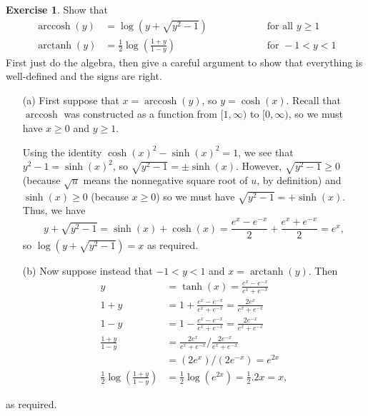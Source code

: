 \documentclass[a4paper]{book}
\newcommand{\arccosh}  {\operatorname{arccosh}}
\newcommand{\arctanh}  {\operatorname{arctanh}}
\renewcommand{\:}{\colon}
\theoremstyle{definition}
\newtheorem{exercise}[theorem]{Exercise}
\renewenvironment{solution}{\SolutionInline}{\endSolutionInline}
\begin{document}
\begin{exercise}
 Show that
 \[ \begin{array}{rlll}
  \arccosh(y) &= \log(y+\sqrt{y^2-1})
              & \hspace{4em} & \text{ for all } y\geq 1 \\
  \arctanh(y) &= \frac{1}{2}\log\left(\frac{1+y}{1-y}\right)
              & \hspace{4em} & \text{ for } -1<y<1
 \end{array} \]
 First just do the algebra, then give a careful argument to show that
 everything is well-defined and the signs are right.
\end{exercise}
\begin{solution}
 \begin{itemize}
 \item[(a)] First suppose that $x=\arccosh(y)$, so $y=\cosh(x)$.
  Recall that $\arccosh$ was constructed as a function from
  $[1,\infty)$ to $[0,\infty)$, so we must have $x\geq 0$ and
  $y\geq 1$.

  Using the identity $\cosh(x)^2-\sinh(x)^2=1$, we see that
  $y^2-1=\sinh(x)^2$, so $\sqrt{y^2-1}=\pm\sinh(x)$.  However,
  $\sqrt{y^2-1}\geq 0$ (because $\sqrt{u}$ means the nonnegative
  square root of $u$, by definition) and $\sinh(x)\geq 0$ (because
  $x\geq 0$) so we must have $\sqrt{y^2-1}=+\sinh(x)$.  Thus, we have
  \[ y + \sqrt{y^2-1} = \sinh(x)+\cosh(x) = 
      \frac{e^x-e^{-x}}{2}+\frac{e^x+e^{-x}}{2} = e^x, \]
  so $\log(y + \sqrt{y^2-1})=x$ as required.
 \item[(b)] Now suppose instead that $-1<y<1$ and $x=\arctanh(y)$.  Then
   \begin{align*}
    y &= \tanh(x) = \frac{e^x-e^{-x}}{e^x+e^{-x}} \\
    1+y &= 1 + \frac{e^x-e^{-x}}{e^x+e^{-x}} = \frac{2e^x}{e^x+e^{-x}} \\
    1-y &= 1 - \frac{e^x-e^{-x}}{e^x+e^{-x}} = \frac{2e^{-x}}{e^x+e^{-x}} \\
    \frac{1+y}{1-y} &= \frac{2e^x}{e^x+e^{-x}} / \frac{2e^{-x}}{e^x+e^{-x}} \\
                    &= (2e^x)/(2e^{-x}) = e^{2x} \\
    \frac{1}{2}\log\left(\frac{1+y}{1-y}\right) &=
      \frac{1}{2} \log(e^{2x}) = \frac{1}{2}.2x = x,
   \end{align*}
 \end{itemize}
 as required.
\end{solution}
\end{document}
